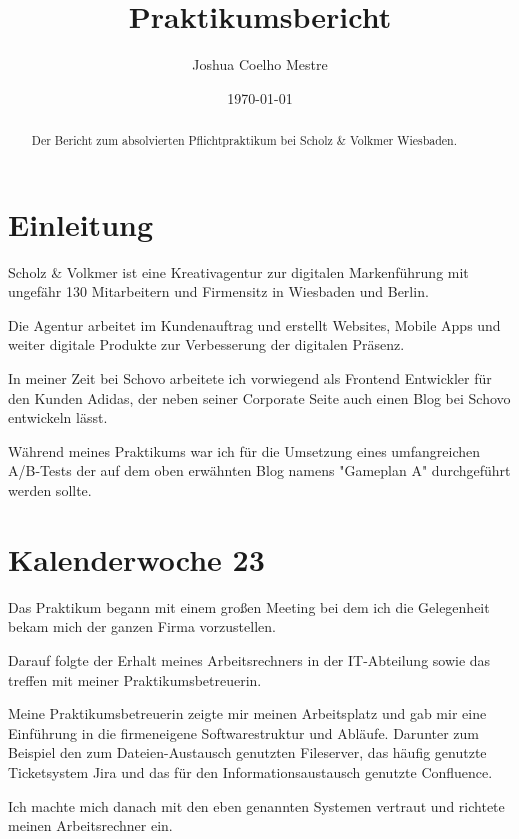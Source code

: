 \documentclass[11pt]{article} %
\title{Praktikumsbericht}
\author{Joshua Coelho Mestre}
\date{\today} %
\begin{document}
\maketitle
\begin{abstract}
Der Bericht zum absolvierten Pflichtpraktikum bei Scholz \& Volkmer Wiesbaden.
\end{abstract}
\newpage
\tableofcontents %
\newpage %

\section{Einleitung} \label{sec:einf}
Scholz \& Volkmer ist eine Kreativagentur zur digitalen Markenführung mit ungefähr 130 Mitarbeitern und Firmensitz in Wiesbaden und Berlin.

Die Agentur arbeitet im Kundenauftrag und erstellt Websites, Mobile Apps und weiter digitale Produkte zur Verbesserung der digitalen Präsenz.

In meiner Zeit bei Schovo arbeitete ich vorwiegend als Frontend Entwickler für den Kunden Adidas, der neben seiner Corporate Seite auch einen Blog bei Schovo entwickeln lässt.

Während meines Praktikums war ich für die Umsetzung eines umfangreichen A/B-Tests der auf dem oben erwähnten Blog namens "Gameplan A" durchgeführt werden sollte.


\newpage

\section{Kalenderwoche 23} \label{sec:kw23}

Das Praktikum begann mit einem großen Meeting bei dem ich die Gelegenheit bekam mich der ganzen Firma vorzustellen.

Darauf folgte der Erhalt meines Arbeitsrechners in der IT-Abteilung sowie das treffen mit meiner Praktikumsbetreuerin.

Meine Praktikumsbetreuerin zeigte mir meinen Arbeitsplatz und gab mir eine Einführung in die firmeneigene Softwarestruktur und Abläufe. Darunter zum Beispiel den zum Dateien-Austausch genutzten Fileserver, das häufig genutzte Ticketsystem Jira und das für den Informationsaustausch genutzte Confluence.

Ich machte mich danach mit den eben genannten Systemen vertraut und richtete meinen Arbeitsrechner ein.
\end{document}
